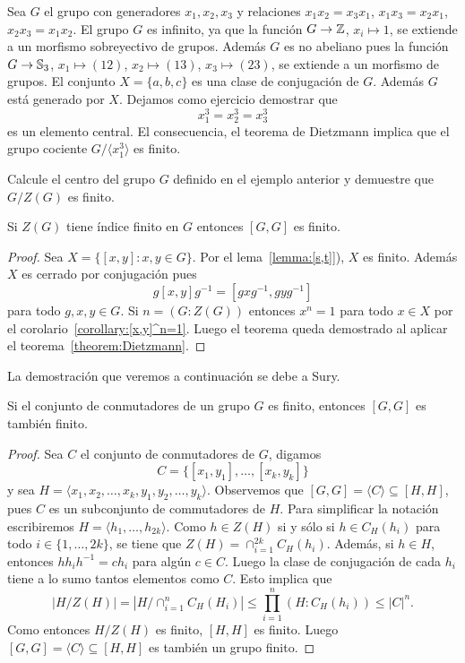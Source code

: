 \begin{example}
Sea $G$ el grupo con generadores $x_1,x_2,x_3$ y relaciones $x_1x_2=x_3x_1$, $x_1x_3=x_2x_1$, $x_2x_3=x_1x_2$. 
El grupo $G$ es infinito, ya que la función 
$G\to\mathbb{Z}$, $x_i\mapsto 1$, se extiende a un morfismo sobreyectivo de grupos. Además $G$ es no abeliano
pues la función $G\to\mathbb{S}_3$, $x_1\mapsto (12)$, $x_2\mapsto (13)$, $x_3\mapsto (23)$, se extiende a un morfismo
de grupos. 
El conjunto
$X=\{a,b,c\}$ es una clase de conjugación de $G$. Además $G$ está generado por $X$. 
Dejamos como ejercicio demostrar que 
\[
x_1^3=x_2^3=x_3^3 
\]
es un elemento central. El consecuencia, el teorema de Dietzmann implica que
el grupo cociente $G/\langle x_1^3\rangle$ es finito. 
\end{example}

\begin{exercise}
Calcule el centro del grupo $G$ definido en el ejemplo anterior y demuestre que
$G/Z(G)$ es finito. 
\end{exercise}

\begin{theorem}[Schur]
	\label{theorem:Schur_commutador}
	Si $Z(G)$ tiene índice finito en $G$ entonces $[G,G]$ es finito.
\end{theorem}

\begin{proof}
	Sea $X=\{[x,y]:x,y\in G\}$. Por el lema~\ref{lemma:[s,t]}), $X$ es finito.
	Además $X$ es cerrado por conjugación pues
	\[
		g[x,y]g^{-1}=[gxg^{-1},gyg^{-1}]
	\]
	para todo $g,x,y\in G$. Si $n=(G:Z(G))$ entonces $x^n=1$ para todo $x\in X$
	por el corolario~\ref{corollary:[x,y]^n=1}. Luego el teorema queda demostrado 
	al aplicar el teorema~\ref{theorem:Dietzmann}.
\end{proof}

La demostración que veremos a continuación se debe a Sury. 

\begin{theorem}[Niroomand]
	Si el conjunto de conmutadores de un grupo $G$ es finito, entonces
	$[G,G]$ es también finito.
\end{theorem}

\begin{proof}
	Sea $C$ el conjunto de conmutadores de $G$, digamos 
	\[
	C=\{[x_1,y_1],\dots,[x_k,y_k]\}
	\]
	y sea $H=\langle x_1,x_2,\dots,x_k,y_1,y_2,\dots,y_k\rangle$. Observemos que
	$[G,G]=\langle C\rangle\subseteq [H,H]$, pues $C$ es un subconjunto de commutadores de $H$. 
	Para simplificar la notación escribiremos $H=\langle h_1,\dots,h_{2k}\rangle$. 
	Como $h\in Z(H)$ si y sólo si $h\in C_H(h_i)$ para todo
	$i\in\{1,\dots,2k\}$, se tiene que $Z(H)=\cap_{i=1}^{2k} C_H(h_i)$. Además, si
	$h\in H$, entonces $hh_ih^{-1}=ch_i$ para algún $c\in C$. Luego la clase de
	conjugación de cada $h_i$ tiene a lo sumo tantos elementos como $C$. Esto
	implica que
	\[
		|H/Z(H)|=|H/\cap_{i=1}^n C_H(H_i)|\leq\prod_{i=1}^n (H:C_H(h_i))\leq |C|^n.
	\]
	Como entonces $H/Z(H)$ es finito, $[H,H]$ es finito. Luego 
	$[G,G]=\langle C\rangle\subseteq [H,H]$ 
	es también un grupo finito.
\end{proof}

